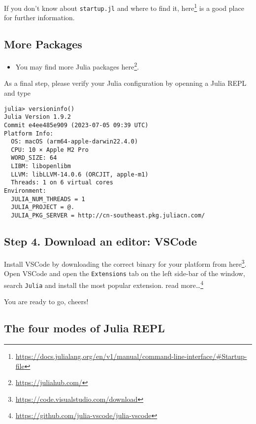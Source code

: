 \documentclass[
  notoc %
]{tufte-book}
\DeclareRobustCommand{\href}[2]{#2\footnote{\url{#1}}}
\providecommand{\tightlist}{%
  \setlength{\itemsep}{0pt}\setlength{\parskip}{0pt}
}
\newcommand{\passthrough}[1]{#1}
\begin{document}
If you don't know about \passthrough{\lstinline!startup.jl!} and where
to find it,
\href{https://docs.julialang.org/en/v1/manual/command-line-interface/\#Startup-file}{here}
is a good place for further information.

\hypertarget{more-packages}{%
\subsection{More Packages}\label{more-packages}}

\begin{itemize}
\tightlist
\item
  You may find more Julia packages \href{https://juliahub.com/}{here}.
\end{itemize}

As a final step, please verify your Julia configuration by openning a
Julia REPL and type

\begin{lstlisting}
julia> versioninfo()
Julia Version 1.9.2
Commit e4ee485e909 (2023-07-05 09:39 UTC)
Platform Info:
  OS: macOS (arm64-apple-darwin22.4.0)
  CPU: 10 × Apple M2 Pro
  WORD_SIZE: 64
  LIBM: libopenlibm
  LLVM: libLLVM-14.0.6 (ORCJIT, apple-m1)
  Threads: 1 on 6 virtual cores
Environment:
  JULIA_NUM_THREADS = 1
  JULIA_PROJECT = @.
  JULIA_PKG_SERVER = http://cn-southeast.pkg.juliacn.com/ 
\end{lstlisting}

\hypertarget{step-4.-download-an-editor-vscode}{%
\subsection{Step 4. Download an editor:
VSCode}\label{step-4.-download-an-editor-vscode}}

Install VSCode by downloading the correct binary for your platform from
\href{https://code.visualstudio.com/download}{here}. Open VSCode and
open the \passthrough{\lstinline!Extensions!} tab on the left side-bar
of the window, search \passthrough{\lstinline!Julia!} and install the
most popular extension.
\href{https://github.com/julia-vscode/julia-vscode}{read more\ldots{}}

You are ready to go, cheers!

\hypertarget{the-four-modes-of-julia-repl}{%
\subsection{The four modes of Julia
REPL}\label{the-four-modes-of-julia-repl}}
\end{document}
